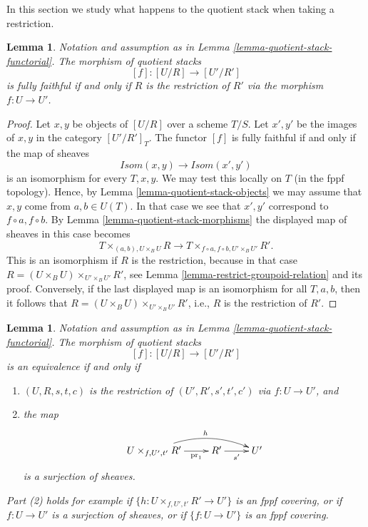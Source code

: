 \documentclass{stacks-project}
\theoremstyle{plain}
\newtheorem{lemma}[subsection]{Lemma}
\theoremstyle{definition}
\theoremstyle{remark}
\numberwithin{equation}{subsection}
\begin{document}
\noindent
In this section we study what happens to the quotient stack
when taking a restriction.

\begin{lemma}
\label{lemma-quotient-stack-restrict}
Notation and assumption as in
Lemma \ref{lemma-quotient-stack-functorial}.
The morphism of quotient stacks
$$
[f] : [U/R] \longrightarrow [U'/R']
$$
is fully faithful if and only if $R$ is the restriction of
$R'$ via the morphism $f : U \to U'$.
\end{lemma}

\begin{proof}
Let $x, y$ be objects of $[U/R]$ over a scheme $T/S$.
Let $x', y'$ be the images of $x, y$ in the category $[U'/R']_T$.
The functor $[f]$ is fully faithful if and only if the map of sheaves
$$
\mathit{Isom}(x, y) \longrightarrow \mathit{Isom}(x', y')
$$
is an isomorphism for every $T, x, y$. We may test this locally on $T$
(in the fppf topology). Hence, by
Lemma \ref{lemma-quotient-stack-objects}
we may assume that $x, y$ come from $a, b \in U(T)$.
In that case we see that $x', y'$ correspond to $f \circ a, f \circ b$. By
Lemma \ref{lemma-quotient-stack-morphisms}
the displayed map of sheaves in this case becomes
$$
T \times_{(a, b), U \times_B U} R
\longrightarrow
T \times_{f \circ a, f \circ b, U' \times_B U'} R'.
$$
This is an isomorphism if $R$ is the restriction, because in that case
$R = (U \times_B U) \times_{U' \times_B U'} R'$, see
Lemma \ref{lemma-restrict-groupoid-relation}
and its proof. Conversely, if the last displayed map is an isomorphism
for all $T, a, b$, then it follows that
$R = (U \times_B U) \times_{U' \times_B U'} R'$, i.e.,
$R$ is the restriction of $R'$.
\end{proof}

\begin{lemma}
\label{lemma-quotient-stack-restrict-equivalence}
Notation and assumption as in
Lemma \ref{lemma-quotient-stack-functorial}.
The morphism of quotient stacks
$$
[f] : [U/R] \longrightarrow [U'/R']
$$
is an equivalence if and only if
\begin{enumerate}
\item $(U, R, s, t, c)$ is the restriction of $(U', R', s', t', c')$
via $f : U \to U'$, and
\item the map
$$
\xymatrix{
U \times_{f, U', t'} R' \ar[r]_-{\text{pr}_1} \ar@/^3ex/[rr]^h
& R' \ar[r]_{s'} & U'
}
$$
is a surjection of sheaves.
\end{enumerate}
Part (2) holds for example if $\{h : U \times_{f, U', t'} R' \to U'\}$
is an fppf covering, or if $f : U \to U'$ is a surjection of sheaves, or if
$\{f : U \to U'\}$ is an fppf covering.
\end{lemma}
\end{document}
